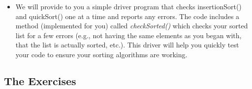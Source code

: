 \documentclass[11pt]{article}
\begin{document}
\begin{itemize}
	\item We will provide to you a simple driver program that checks insertionSort() and quickSort() one at a time and reports any errors. The code includes a method (implemented for you) called {\emph{checkSorted()}} which checks your sorted list for a few errors (e.g., not having the same elements as you began with, that the list is actually sorted, etc.). This driver will help you quickly test your code to ensure your sorting algorithms are working.
	

\end{itemize}

\subsection*{The Exercises}
\end{document}
